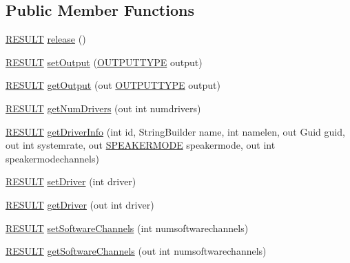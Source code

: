 \subsection*{Public Member Functions}
\begin{DoxyCompactItemize}
\item 
\hyperlink{namespace_f_m_o_d_a305d1176ef3f8c8815861a60407ac33d}{R\+E\+S\+U\+LT} \hyperlink{class_f_m_o_d_1_1_system_a04ecea3393b620b5da5cf594e2056b1d}{release} ()
\item 
\hyperlink{namespace_f_m_o_d_a305d1176ef3f8c8815861a60407ac33d}{R\+E\+S\+U\+LT} \hyperlink{class_f_m_o_d_1_1_system_a3c0972e6977b3ec97e45b5b1344c892e}{set\+Output} (\hyperlink{namespace_f_m_o_d_a79371777bf570d74477038541f318485}{O\+U\+T\+P\+U\+T\+T\+Y\+PE} output)
\item 
\hyperlink{namespace_f_m_o_d_a305d1176ef3f8c8815861a60407ac33d}{R\+E\+S\+U\+LT} \hyperlink{class_f_m_o_d_1_1_system_a6e969a761739487018514291d7755a8e}{get\+Output} (out \hyperlink{namespace_f_m_o_d_a79371777bf570d74477038541f318485}{O\+U\+T\+P\+U\+T\+T\+Y\+PE} output)
\item 
\hyperlink{namespace_f_m_o_d_a305d1176ef3f8c8815861a60407ac33d}{R\+E\+S\+U\+LT} \hyperlink{class_f_m_o_d_1_1_system_a93325ff7d2ffbd291208ea5a40ab8416}{get\+Num\+Drivers} (out int numdrivers)
\item 
\hyperlink{namespace_f_m_o_d_a305d1176ef3f8c8815861a60407ac33d}{R\+E\+S\+U\+LT} \hyperlink{class_f_m_o_d_1_1_system_ae1b48e7caf6d3459a537d7a61587bccf}{get\+Driver\+Info} (int id, String\+Builder name, int namelen, out Guid guid, out int systemrate, out \hyperlink{namespace_f_m_o_d_aa0732e7e8efd3b96b526a7f2f8479634}{S\+P\+E\+A\+K\+E\+R\+M\+O\+DE} speakermode, out int speakermodechannels)
\item 
\hyperlink{namespace_f_m_o_d_a305d1176ef3f8c8815861a60407ac33d}{R\+E\+S\+U\+LT} \hyperlink{class_f_m_o_d_1_1_system_ae33b8496a16bf9331fd960e613ef5d44}{set\+Driver} (int driver)
\item 
\hyperlink{namespace_f_m_o_d_a305d1176ef3f8c8815861a60407ac33d}{R\+E\+S\+U\+LT} \hyperlink{class_f_m_o_d_1_1_system_a3df9be7f70a7f711c7ac0d463ebdfe93}{get\+Driver} (out int driver)
\item 
\hyperlink{namespace_f_m_o_d_a305d1176ef3f8c8815861a60407ac33d}{R\+E\+S\+U\+LT} \hyperlink{class_f_m_o_d_1_1_system_afd73f76b6efe4dda3f9414772ae7ac8b}{set\+Software\+Channels} (int numsoftwarechannels)
\item 
\hyperlink{namespace_f_m_o_d_a305d1176ef3f8c8815861a60407ac33d}{R\+E\+S\+U\+LT} \hyperlink{class_f_m_o_d_1_1_system_a6125c6ba10048627c58faa4c62e0a04e}{get\+Software\+Channels} (out int numsoftwarechannels)

\end{DoxyCompactItemize}
